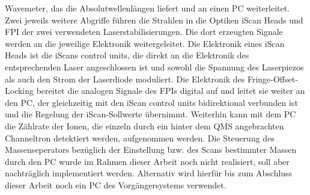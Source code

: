 Wavemeter, das die Absolutwellenlängen liefert und an einen PC weiterleitet.
Zwei jeweils weitere Abgriffe führen die Strahlen in die Optiken iScan Heads und FPI der zwei verwendeten
Laserstabilisierungen. Die dort erzeugten Signale werden an die jeweilige Elektronik
weitergeleitet. Die Elektronik eines iScan Heads ist die iScans control units, die direkt an die Elektronik des entsprechenden Laser
angeschlossen ist und sowohl die Spannung des Laserpiezos als auch den Strom
der Laserdiode moduliert. Die Elektronik des Fringe-Offset-Locking bereitet die
analogen Signale des FPIs digital auf und leitet sie weiter an den PC, der
gleichzeitig mit den iScan control units bidirektional verbunden ist und die
Regelung der iScan-Sollwerte übernimmt. Weiterhin kann mit dem PC die Zählrate
der Ionen, die einzeln durch ein hinter dem QMS angebrachten Channeltron
detektiert werden, aufgenommen werden. Die Steuerung des Massenseperators
bezüglich der Einstellung bzw. des Scans bestimmter Massen durch den PC wurde im
Rahmen dieser Arbeit noch nicht realisiert, soll aber nachträglich implementiert
werden. Alternativ wird hierfür bis zum Abschluss dieser Arbeit noch ein PC des
Vorgängersystems verwendet.

